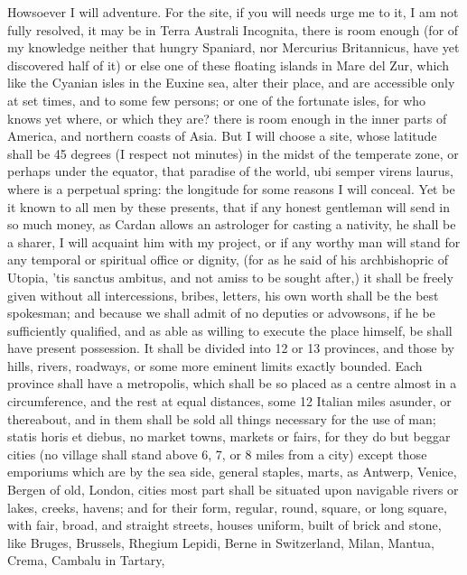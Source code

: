 {Howsoever I will adventure. For the site, if you will needs urge me to
it, I am not fully resolved, it may be in Terra Australi Incognita,
there is room enough (for of my knowledge neither that hungry Spaniard,
nor Mercurius Britannicus, have yet discovered half of it) or else
one of these floating islands in Mare del Zur, which like the Cyanian
isles in the Euxine sea, alter their place, and are accessible only at
set times, and to some few persons; or one of the fortunate isles, for
who knows yet where, or which they are? there is room enough in the
inner parts of America, and northern coasts of Asia. But I will choose
a site, whose latitude shall be 45 degrees (I respect not minutes) in
the midst of the temperate zone, or perhaps under the equator, that
paradise of the world, ubi semper virens laurus, \etc{} where is a
perpetual spring: the longitude for some reasons I will conceal. Yet be
it known to all men by these presents, that if any honest gentleman
will send in so much money, as Cardan allows an astrologer for casting
a nativity, he shall be a sharer, I will acquaint him with my project,
or if any worthy man will stand for any temporal or spiritual office or
dignity, (for as he said of his archbishopric of Utopia, 'tis sanctus
ambitus, and not amiss to be sought after,) it shall be freely given
without all intercessions, bribes, letters, \etc{} his own worth shall be
the best spokesman; and because we shall admit of no deputies or
advowsons, if he be sufficiently qualified, and as able as willing to
execute the place himself, be shall have present possession. It shall
be divided into 12 or 13 provinces, and those by hills, rivers,
roadways, or some more eminent limits exactly bounded. Each province
shall have a metropolis, which shall be so placed as a centre almost in
a circumference, and the rest at equal distances, some 12 Italian miles
asunder, or thereabout, and in them shall be sold all things necessary
for the use of man; statis horis et diebus, no market towns, markets or
fairs, for they do but beggar cities (no village shall stand above 6,
7, or 8 miles from a city) except those emporiums which are by the sea
side, general staples, marts, as Antwerp, Venice, Bergen of old,
London, \etc{} cities most part shall be situated upon navigable rivers or
lakes, creeks, havens; and for their form, regular, round, square, or
long square, with fair, broad, and straight streets, houses
uniform, built of brick and stone, like Bruges, Brussels, Rhegium
Lepidi, Berne in Switzerland, Milan, Mantua, Crema, Cambalu in Tartary,
}
